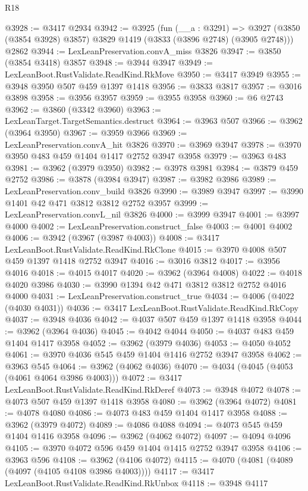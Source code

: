 \begin{lexlean}{R18}
\begin{coremodule}
@3928 := @3417 @2934
@3942 := @3925
    (fun (__a : @3291) =>
    @3927 (@3850 (@3854 @3928) @3857) @3829 @1419 (@3833 (@3896 @2748) (@3905 @2748)))
    @2862
@3944 := LexLeanPreservation.convA_miss @3826
@3947 := @3850 (@3854 @3418) @3857
@3948 := @3944 @3947
@3949 := LexLeanBoot.RustValidate.ReadKind.RkMove
@3950 := @3417 @3949
@3955 := @3948 @3950 @507 @459 @1397 @1418
@3956 := @3833 @3817
@3957 := @3016 @3898
@3958 := @3956 @3957
@3959 := @3955 @3958
@3960 := @6 @2743
@3962 := @3860 (@3342 @3960)
@3963 := LexLeanTarget.TargetSemantics.destruct
@3964 := @3963 @507
@3966 := @3962 (@3964 @3950)
@3967 := @3959 @3966
@3969 := LexLeanPreservation.convA_hit @3826
@3970 := @3969 @3947
@3978 := @3970 @3950 @483 @459 @1404 @1417 @2752 @3947 @3958
@3979 := @3963 @483
@3981 := @3962 (@3979 @3950)
@3982 := @3978 @3981
@3984 := @3879 @459 @2752
@3986 := @3878 (@3984 @3947)
@3987 := @3982 @3986
@3989 := LexLeanPreservation.conv_build @3826
@3990 := @3989 @3947
@3997 := @3990 @1401 @42 @471 @3812 @3812 @2752 @3957
@3999 := LexLeanPreservation.convL_nil @3826
@4000 := @3999 @3947
@4001 := @3997 @4000
@4002 := LexLeanPreservation.construct_false
@4003 := @4001 @4002
@4006 := @3942 (@3967 (@3987 @4003))
@4008 := @3417 LexLeanBoot.RustValidate.ReadKind.RkClone
@4015 := @3970 @4008 @507 @459 @1397 @1418 @2752 @3947
@4016 := @3016 @3812
@4017 := @3956 @4016
@4018 := @4015 @4017
@4020 := @3962 (@3964 @4008)
@4022 := @4018 @4020 @3986
@4030 := @3990 @1394 @42 @471 @3812 @3812 @2752 @4016 @4000
@4031 := LexLeanPreservation.construct_true
@4034 := @4006 (@4022 (@4030 @4031))
@4036 := @3417 LexLeanBoot.RustValidate.ReadKind.RkCopy
@4037 := @3948 @4036
@4042 := @4037 @507 @459 @1397 @1418 @3958
@4044 := @3962 (@3964 @4036)
@4045 := @4042 @4044
@4050 := @4037 @483 @459 @1404 @1417 @3958
@4052 := @3962 (@3979 @4036)
@4053 := @4050 @4052
@4061 := @3970 @4036 @545 @459 @1404 @1416 @2752 @3947 @3958
@4062 := @3963 @545
@4064 := @3962 (@4062 @4036)
@4070 := @4034 (@4045 (@4053 (@4061 @4064 @3986 @4003)))
@4072 := @3417 LexLeanBoot.RustValidate.ReadKind.RkDeref
@4073 := @3948 @4072
@4078 := @4073 @507 @459 @1397 @1418 @3958
@4080 := @3962 (@3964 @4072)
@4081 := @4078 @4080
@4086 := @4073 @483 @459 @1404 @1417 @3958
@4088 := @3962 (@3979 @4072)
@4089 := @4086 @4088
@4094 := @4073 @545 @459 @1404 @1416 @3958
@4096 := @3962 (@4062 @4072)
@4097 := @4094 @4096
@4105 := @3970 @4072 @596 @459 @1404 @1415 @2752 @3947 @3958
@4106 := @3963 @596
@4108 := @3962 (@4106 @4072)
@4115 := @4070 (@4081 (@4089 (@4097 (@4105 @4108 @3986 @4003))))
@4117 := @3417 LexLeanBoot.RustValidate.ReadKind.RkUnbox
@4118 := @3948 @4117

\end{coremodule}
\end{lexlean}
